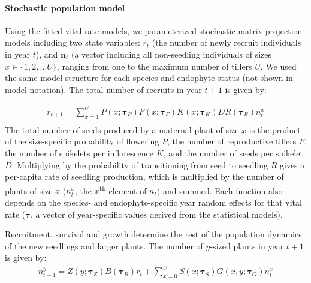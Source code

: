 \documentclass[12pt]{article}
\begin{document}
\paragraph*{Stochastic population model}
Using the fitted vital rate models, we parameterized stochastic matrix projection models including two state variables: $r_{t}$ (the number of newly recruit individuals in year $t$), and $\textbf{n}_{t}$ (a vector including all non-seedling individuals of sizes $x\in\{1,2,...U\} $, ranging from one to the maximum number of tillers $U$. 
We used the same model structure for each species and endophyte status (not shown in model notation). 
The total number of recruits in year $t+1$ is given by:

\begin{equation} 
	\label{eq:MPM_F}
	\begin{aligned}
		r_{t+1} = \sum_{x=1}^{U} P(x; \pmb{\tau}_{P})F(x; \pmb{\tau}_{F})K(x; \pmb{\tau}_{K})DR(\pmb{\tau}_{R}) n^x_{t}\\
	\end{aligned}
\end{equation}
The total number of seeds produced by a maternal plant of size $x$ is the product of the size-specific probability of flowering $P$, the number of reproductive tillers $F$, the number of spikelets per inflorescence $K$, and the number of seeds per spikelet $D$. 
Multiplying by the probability of transitioning from seed to seedling $R$ gives a per-capita rate of seedling production, which is multiplied by the number of plants of size $x$ ($n^x_{t}$, the $x$\textsuperscript{th} element of \textbf{$n_{t}$}) and summed. 
Each function also depends on the species- and endophyte-specific year random effects for that vital rate ($\pmb{\tau}$, a vector of year-specific values derived from the statistical models). 

Recruitment, survival and growth determine the rest of the population dynamics of the new seedlings and larger plants. 
The number of $y$-sized plants in year $t+1$ is given by:
\begin{equation} 
	\label{eq:MPM_T}
	\begin{aligned}
		n^y_{t+1} = Z(y; \pmb{\tau}_{Z})B(\pmb{\tau}_{B})r_{t}  + 
		\sum_{x=0}^{U} S(x; \pmb{\tau}_{S})G(x,y; \pmb{\tau}_{G}) n^x_{t}\\
	\end{aligned}
\end{equation}
\end{document}
